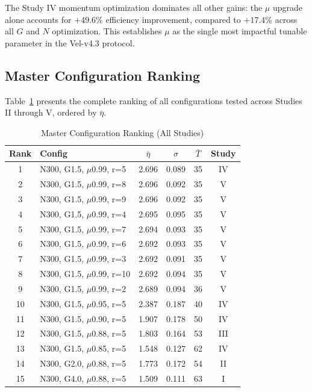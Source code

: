 \documentclass[journal,compsoc]{IEEEtran}
\begin{document}
The Study IV momentum optimization dominates all other gains: the $\mu$ upgrade alone
accounts for $+49.6\%$ efficiency improvement, compared to $+17.4\%$ across all $G$
and $N$ optimization. This establishes $\mu$ as the single most impactful tunable
parameter in the Vel-v4.3 protocol.

\subsection{Master Configuration Ranking}

Table~\ref{tab:master} presents the complete ranking of all configurations tested
across Studies II through V, ordered by $\bar{\eta}$.

\begin{table}[H]
\renewcommand{\arraystretch}{1.2}
\caption{Master Configuration Ranking (All Studies)}
\label{tab:master}
\centering
\begin{tabular}{clcccc}
\hline
Rank & Config & $\bar{\eta}$ & $\sigma$ & $\bar{T}$ & Study \\
\hline
1  & N300, G1.5, $\mu$0.99, r=5 & 2.696 & 0.089 & 35 & IV \\
2  & N300, G1.5, $\mu$0.99, r=8 & 2.696 & 0.092 & 35 & V \\
3  & N300, G1.5, $\mu$0.99, r=9 & 2.696 & 0.092 & 35 & V \\
4  & N300, G1.5, $\mu$0.99, r=4 & 2.695 & 0.095 & 35 & V \\
5  & N300, G1.5, $\mu$0.99, r=7 & 2.694 & 0.093 & 35 & V \\
6  & N300, G1.5, $\mu$0.99, r=6 & 2.692 & 0.093 & 35 & V \\
7  & N300, G1.5, $\mu$0.99, r=3 & 2.692 & 0.091 & 35 & V \\
8  & N300, G1.5, $\mu$0.99, r=10& 2.692 & 0.094 & 35 & V \\
9  & N300, G1.5, $\mu$0.99, r=2 & 2.689 & 0.094 & 36 & V \\
10 & N300, G1.5, $\mu$0.95, r=5 & 2.387 & 0.187 & 40 & IV \\
11 & N300, G1.5, $\mu$0.90, r=5 & 1.907 & 0.178 & 50 & IV \\
12 & N300, G1.5, $\mu$0.88, r=5 & 1.803 & 0.164 & 53 & III \\
13 & N300, G1.5, $\mu$0.85, r=5 & 1.548 & 0.127 & 62 & IV \\
14 & N300, G2.0, $\mu$0.88, r=5 & 1.773 & 0.172 & 54 & II \\
15 & N300, G4.0, $\mu$0.88, r=5 & 1.509 & 0.111 & 63 & I \\
\hline
\end{tabular}
\end{table}
\end{document}
